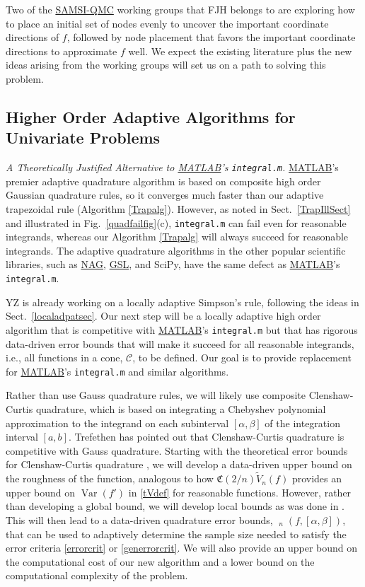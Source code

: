 \documentclass[11pt]{NSFamsart}
\newcommand{\SAMSIQMC}{\hyperlink{SAMSIlink}{SAMSI-QMC}\xspace}
\newcommand{\GSL}{\hyperlink{GSLlink}{GSL}\xspace}
\newcommand{\NAG}{\hyperlink{NAGlink}{NAG}\xspace}
\newcommand{\MATLAB}{\hyperlink{MATLABlink}{MATLAB}\xspace}
\newcommand{\tV}{\widetilde{V}}
\DeclareMathOperator{\err}{err}
\DeclareMathOperator{\herr}{\widehat{\err}}
\DeclareMathOperator{\Var}{Var}
\newcommand{\cc}{\mathcal{C}}
\newcommand{\fC}{\mathfrak{C}}
\begin{document}
Two of the \SAMSIQMC working groups that FJH belongs to are exploring how to
place an initial set 
of nodes evenly to uncover the important coordinate directions of $f$, followed by node 
placement that favors the important 
coordinate directions to approximate $f$ well.  We expect the existing literature plus the new ideas 
arising from the working groups will set us on a path to solving this problem.

\subsection{Higher Order Adaptive Algorithms for Univariate Problems}\label{SectUniProb}

\emph{A Theoretically Justified Alternative to \MATLAB's 
\textup{\texttt{integral.m}}.} 
\MATLAB's premier adaptive quadrature algorithm is based on composite high order Gaussian 
quadrature rules, so it converges much faster than our adaptive trapezoidal rule (Algorithm 
\ref{Trapalg}). However, as noted in Sect.\ \ref{TrapIllSect} and illustrated in Fig.\ 
\ref{quadfailfig}(c), 
\texttt{integral.m} can fail even for reasonable integrands, whereas our Algorithm 
\ref{Trapalg} will always succeed for reasonable integrands. The adaptive quadrature algorithms in 
the other popular scientific libraries, 
such as \NAG, \GSL, and SciPy, have the same defect as \MATLAB's \texttt{integral.m}.  

YZ is already working on a locally adaptive Simpson's rule, following the ideas in Sect.\ 
\ref{localadpatsec}.  Our next step will be a 
locally adaptive high order algorithm that is competitive with \MATLAB's \texttt{integral.m} but that 
has 
rigorous data-driven error bounds that will make it succeed for all reasonable 
integrands, i.e., all functions in a cone, $\cc$, to be defined.  Our goal is to provide replacement for 
\MATLAB's \texttt{integral.m} and similar algorithms.  

Rather than use Gauss quadrature rules, we will likely use composite Clenshaw-Curtis quadrature, 
which is based on integrating a Chebyshev polynomial approximation to the integrand on each 
subinterval 
$[\alpha, \beta]$ of the integration interval $[a,b]$.  
Trefethen \cite{Tre08a} has pointed out that Clenshaw-Curtis quadrature is competitive with Gauss 
quadrature.  Starting with the theoretical error bounds for Clenshaw-Curtis quadrature 
\cite{BraPet11a}, we will develop a data-driven upper bound on the roughness of the 
function, 
analogous to how $\fC(2/n)\tV_n(f)$ provides  an upper bound on $\Var(f')$ in \eqref{tVdef} for 
reasonable functions.  However, rather than developing a global bound, we will develop local bounds 
as was done in \cite{ChoEtal17a}.  This will then lead to a data-driven quadrature error bounds, 
$\herr_n(f,[\alpha,\beta])$, that 
can be used to adaptively determine the sample size needed to satisfy the error criteria 
\eqref{errorcrit} or \eqref{generrorcrit}.  We will also provide an upper bound on the computational 
cost of our new algorithm and a lower bound on the computational complexity of the problem.
\end{document}
